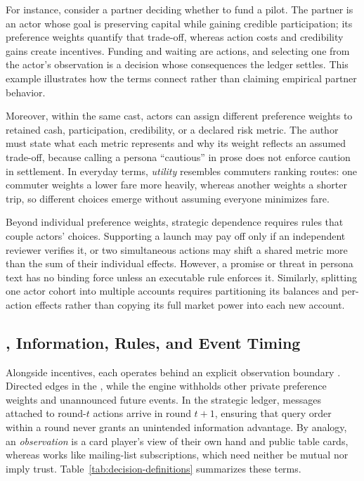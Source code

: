 For instance, consider a partner deciding whether to fund a pilot. The
partner is an actor whose goal is preserving capital while gaining credible
participation; its preference weights quantify that trade-off, whereas action
costs and credibility gains create incentives. Funding and waiting are actions,
and selecting one from the actor's observation is a decision whose consequences
the ledger settles. This example illustrates how the terms connect rather than
claiming empirical partner behavior.

Moreover, within the same cast, actors can assign different preference
weights to retained cash, participation, credibility, or a declared risk
metric. The author must state what each metric represents and why its weight
reflects an assumed trade-off, because calling a persona ``cautious'' in prose
does not enforce caution in settlement. In everyday terms, \textit{utility}
resembles commuters ranking routes: one commuter weights a lower fare more
heavily, whereas another weights a shorter trip, so different choices emerge
without assuming everyone minimizes fare.

Beyond individual preference weights, strategic dependence requires rules
that couple actors' choices. Supporting a launch may pay off only if an
independent reviewer verifies it, or two simultaneous actions may shift a
shared metric more than the sum of their individual effects. However, a
promise or threat in persona text has no binding force unless an executable
rule enforces it. Similarly, splitting one actor cohort into multiple accounts
requires partitioning its balances and per-action effects rather than copying
its full market power into each new account.

\subsection{, Information, Rules, and Event Timing}
Alongside incentives, each  operates behind an explicit
observation boundary . Directed edges in
the , while the engine withholds other  private preference
weights and unannounced future events. In the strategic ledger, messages
attached to round-$t$ actions arrive in round $t+1$, ensuring that query order
within a round never grants an unintended information advantage. By analogy, an
\textit{observation} is a card player's view of their own hand and public table
cards, whereas  works like mailing-list
subscriptions, which need neither be mutual nor imply trust.
Table~\ref{tab:decision-definitions} summarizes these terms.

